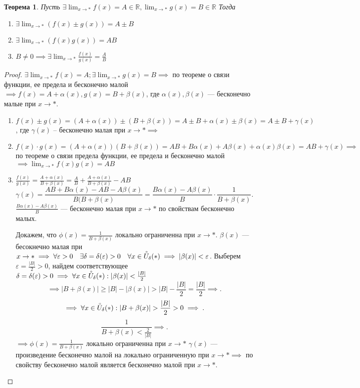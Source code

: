 \documentclass[a4paper,12pt]{article} %
\newtheorem{theorem}{Теорема}[section]
\theoremstyle{remark}
\theoremstyle{definition}
\begin{document}
\begin{theorem}
	Пусть $\exists \lim_{x \to *} f(x) = A \in  \mathbb{R}, \lim_{x \to *} g(x) = B\in  \mathbb{R}$
	Тогда
	\begin{enumerate}
		\item $\exists \lim_{x \to *} (f(x) \pm g(x)) = A\pm B$
		\item $\exists \lim_{x \to *} (f(x) g(x)) = AB$ 
		\item $B \neq 0 \implies \exists  \lim_{x \to *} \frac{f(x)}{g(x)} = \frac{A}{B}$
	\end{enumerate}
\end{theorem}
\begin{proof}
	$\exists  \lim_{x \to *} f(x) = A; \exists  \lim_{x \to *} g(x) = B \implies$ по теореме о связи функции, ее предела и бесконечно малой $\implies f(x) = A + \alpha(x), g(x) = B + \beta(x)$, где $\alpha(x), \beta(x)$ --- бесконечно малые при $x\to *$.
	
	\begin{enumerate}
		\item $f(x)\pm g(x) = (A + \alpha(x)) \pm (B+ \beta(x)) = A \pm B +\alpha(x) \pm \beta(x) = A \pm B + \gamma(x)$, где $\gamma(x)$ -- бесконечно малая при  $x \to * \implies$
		\item $f(x) \cdot  g(x) = (A + \alpha(x))(B+\beta(x))= AB+B\alpha(x)+A\beta(x) + \alpha(x)\beta(x) = AB + \gamma(x) \implies$ по теореме о связи предела функции, ее предела и бесконечно малой $\implies \lim_{x \to *} f(x)g(x) = AB$
		\item $\frac{f(x)}{g(x)} = \frac{A+\alpha(x)}{B+\beta(x)} = \frac{A}{B} + \frac{A+\alpha(x)}{B + \beta(x)} - AB$
			\[
			\gamma(x) = \frac{AB+B\alpha(x)-AB-A\beta(x)}{B(B+\beta(x)} = \frac{B\alpha(x)-A\beta(x)}{B} \cdot \frac{1}{B+\beta(x)}
			.\] 
			$\frac{B\alpha(x)-A\beta(x)}{B}$ --- бесконечно малая при $x \to  *$ по свойствам бесконечно малых.
			
			Докажем, что $\phi(x)= \frac{1}{B+\beta(x)}$ локально ограниченна при $x \to *$.
			$\beta(x)$ --- бесокнечно малая при $x \to * \implies \forall \varepsilon> 0 \quad \exists \delta=\delta(\varepsilon)>0 \quad \forall x\in \accentset    {\circ}{U}_\delta(*) \implies |\beta(x)| < \varepsilon$.
			Выберем $\varepsilon= \frac{|B|}{2}>0$, найдем соответствующее $\delta=\delta(\varepsilon)>0 \implies \forall  x \in  \accentset{\circ}{U}_\delta(*) : |\beta(x)| < \frac{|B|}{2}$ 
			\[
			\implies |B+\beta(x)| \ge  |B| - |\beta(x)| > |B| - \frac{|B|}{2} = \frac{|B|}{2} \implies
			.\] 
			\[
			\implies \forall x \in  \accentset{\circ}{U}_\delta(*) : |B + \beta(x)| > \frac{|B|}{2} >0 \implies
			.\] 
			\[
			\frac{1}{B+\beta(x)<\frac{2}{|B|}} \implies 
			.\]
			$\implies\phi(x) = \frac{1}{B+\beta(x)}$ локально ограниченна при  $x \to  *$
			$\gamma(x)$ --- произведение бесконечно малой на локально ограниченную при $x \to  *\implies$ по свойству бесконечно малой является бесконечно малой при $x \to *$.
	\end{enumerate}
\end{proof}
\end{document}
